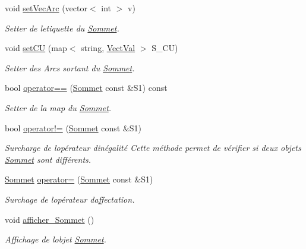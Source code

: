 \begin{DoxyCompactItemize}
void \hyperlink{classSommet_acfb1d54c68ae9dd484efdf129e5bd237}{set\+Vec\+Arc} (vector$<$ int $>$ v)
\begin{DoxyCompactList}\small\item\em Setter de l\textquotesingle{}etiquette du \hyperlink{classSommet}{Sommet}. \end{DoxyCompactList}\item 
\mbox{\label{classSommet_aa2936cb4cd1407820820e3492f4f5054}} 
void \hyperlink{classSommet_aa2936cb4cd1407820820e3492f4f5054}{set\+CU} (map$<$ string, \hyperlink{structVectVal}{Vect\+Val} $>$ S\+\_\+\+CU)
\begin{DoxyCompactList}\small\item\em Setter des Arcs sortant du \hyperlink{classSommet}{Sommet}. \end{DoxyCompactList}\item 
bool \hyperlink{classSommet_a08f26935338b5904256eb6bee274ac1a}{operator==} (\hyperlink{classSommet}{Sommet} const \&S1) const
\begin{DoxyCompactList}\small\item\em Setter de la map du \hyperlink{classSommet}{Sommet}. \end{DoxyCompactList}\item 
bool \hyperlink{classSommet_a4b0f2f9224353b18ae95033431b3be35}{operator!=} (\hyperlink{classSommet}{Sommet} const \&S1)
\begin{DoxyCompactList}\small\item\em Surcharge de l\textquotesingle{}op\'{e}rateur d\textquotesingle{}in\'{e}galit\'{e} Cette m\'{e}thode permet de v\'{e}rifier si deux objets \hyperlink{classSommet}{Sommet} sont diff\'{e}rents. \end{DoxyCompactList}\item 
\mbox{\label{classSommet_a5f4fcf328989cb617d44eb0a4305065c}} 
\hyperlink{classSommet}{Sommet} \hyperlink{classSommet_a5f4fcf328989cb617d44eb0a4305065c}{operator=} (\hyperlink{classSommet}{Sommet} const \&S1)
\begin{DoxyCompactList}\small\item\em Surchage de l\textquotesingle{}op\'{e}rateur d\textquotesingle{}affectation. \end{DoxyCompactList}\item 
\mbox{\label{classSommet_a5d843a257772c8759a51a78166ead3d5}} 
void \hyperlink{classSommet_a5d843a257772c8759a51a78166ead3d5}{afficher\+\_\+\+Sommet} ()
\begin{DoxyCompactList}\small\item\em Affichage de l\textquotesingle{}objet \hyperlink{classSommet}{Sommet}. \end{DoxyCompactList}\end{DoxyCompactItemize}


